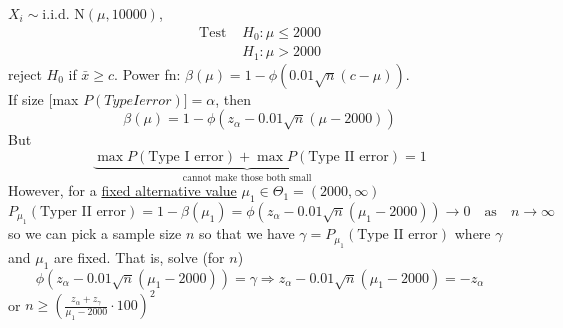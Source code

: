 \documentclass[english, 11pt]{article}
\begin{document}
\begin{exmp}
$X_i\sim \text{i.i.d. N}(\mu, 10000)$, 
$$
\begin{aligned}
\text{Test }& H_0:\mu\leqslant 2000\\
&H_1:\mu>2000
\end{aligned}
$$
reject $H_0$ if $\bar{x}\geqslant c$. Power fn: $\beta(\mu)=1-\phi(0.01\sqrt{n}(c-\mu))$.\\
If size [max $P(Type I error)]=\alpha$, then
$$
\beta(\mu)=1-\phi(z_\alpha-0.01\sqrt{n}(\mu-2000))
$$
But
$$
\underbrace{\max P(\text{Type I error}) + \max P(\text{Type II error})}_{\text{cannot make those both small}}=1
$$
However, for a \underline{fixed alternative value} $\mu_1\in\Theta_1=(2000, \infty)$
$$
P_{\mu_1}(\text{Typer II error})=1-\beta(\mu_1)=\phi(z_\alpha-0.01\sqrt{n}(\mu_1-2000))\rightarrow0\quad\text{as}\quad n\rightarrow\infty
$$
so we can pick a sample size $n$ so that we have $\gamma=P_{\mu_1}(\text{Type II error})$ where $\gamma$ and $\mu_1$ are fixed. That is, solve (for $n$)
$$
\phi(z_\alpha-0.01\sqrt{n}(\mu_1-2000))=\gamma\Rightarrow z_\alpha-0.01\sqrt{n}(\mu_1-2000)=-z_\alpha
$$
or $n\geqslant \left(\frac{z_\alpha+z_\gamma}{\mu_1-2000}\cdot 100\right)^2$
\end{exmp}
\end{document}
